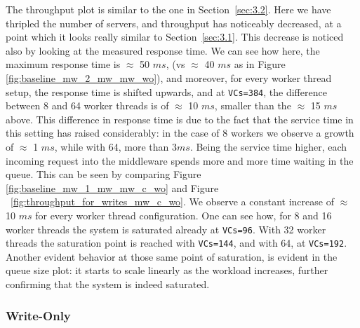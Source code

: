 \documentclass[11pt,a4paper]{article}
\begin{document}
The throughput plot is similar to the one in Section~\ref{sec:3.2}. Here we have thripled the number of servers, and throughput has noticeably decreased, at a point which it looks really similar to Section~\ref{sec:3.1}. This decrease is noticed also by looking at the measured response time. We can see how here, the maximum response time is $\approx$ 50 $ms$, (vs $\approx$ 40 $ms$ as in Figure \ref{fig:baseline_mw_2_mw_mw_wo}), and moreover, for every worker thread setup, the response time is shifted upwards, and at \texttt{VCs=384}, the difference between 8 and 64 worker threads is of $\approx$ 10 $ms$, smaller than the $\approx$ 15 $ms$ above.
This difference in response time is due to the fact that the service time in this setting has raised considerably: in the case of 8 workers we observe a growth of $\approx$ 1 $ms$, while with 64, more than $3ms$. 
Being the service time higher, each incoming request into the middleware spends more and more time waiting in the queue. This can be seen by comparing Figure \ref{fig:baseline_mw_1_mw_mw_c_wo} and Figure ~\ref{fig:throughput_for_writes_mw_c_wo}. We observe a constant increase of $\approx$ 10 $ms$ for every worker thread configuration. 
One can see how, for 8 and 16 worker threads the system is saturated already at \texttt{VCs=96}. With 32 worker threads the saturation point is reached with \texttt{VCs=144}, and with 64, at \texttt{VCs=192}.
Another evident behavior at those same point of saturation, is evident in the queue size plot: it starts to scale linearly as the workload increases, further confirming that the system is indeed saturated.

\subsubsection*{Write-Only}
\end{document}
